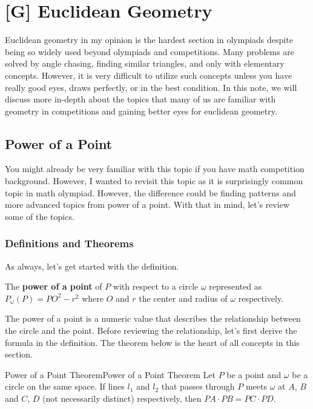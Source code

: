 \documentclass[../../../main.tex]{subfiles}
\begin{document}
\chapter{[G] Euclidean Geometry}

Euclidean geometry in my opinion is the hardest section in
olympiads despite being so widely used beyond olympiads and
competitions. Many problems are solved by angle chasing, finding
similar triangles, and only with elementary concepts. However,
it is very difficult to utilize such concepts unless you have
really good eyes, draws perfectly, or in the best condition.
In this note, we will discuss more in-depth about the topics that
many of us are familiar with geometry in competitions and gaining
better eyes for euclidean geometry.

\section{Power of a Point}

You might already be very familiar with this topic if you have
math competition background. However, I wanted to revisit this
topic as it is surprisingly common topic in math olympiad.
However, the difference could be finding patterns and more
advanced topics from power of a point. With that in mind,
let's review some of the topics.

\subsection{Definitions and Theorems}

As always, let's get started with the definition.

\begin{definition}{}{}
The \textbf{power of a point} of $P$ with respect to a circle
$\omega$ represented as $P_\omega(P) = PO^2 - r^2$ where $O$
and $r$ the center and radius of $\omega$ respectively.
\end{definition}

The power of a point is a numeric value that describes the
relationship between the circle and the point. Before reviewing
the relationship, let's first derive the formula in the definition.
The theorem below is the heart of all concepts in this section.

\begin{theorem}{Power of a Point Theorem}{Power of a Point Theorem}
Let $P$ be a point and $\omega$ be a circle on the same space.
If lines $l_1$ and $l_2$ that passes through $P$ meets $\omega$
at $A$, $B$ and $C$, $D$ (not necessarily distinct) respectively,
then $PA \cdot PB = PC \cdot PD$.
\end{theorem}
\end{document}
